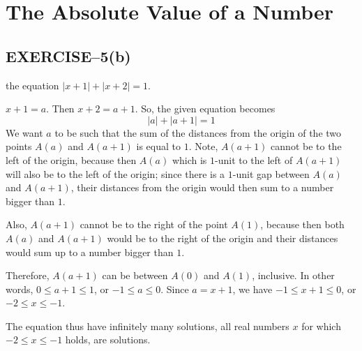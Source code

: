 \documentclass{tufte-book} %
\begin{document}
\section{The Absolute Value of a Number}

\subsection*{EXERCISE--5(b)}

 the equation $|x+1| + |x+2| = 1$.

 $x+1 = a$. Then $x+2 = a+1$. So, the given equation becomes
\[
	|a| + |a+1| = 1
\]
We want $a$ to be such that the sum of the distances from the origin of the two points $A(a)$ and $A(a+1)$ is equal to $1$. Note, $A(a+1)$ cannot be to the left of the origin, because then $A(a)$ which is $1$-unit to the left of $A(a+1)$ will also be to the left of the origin; since there is a $1$-unit gap between $A(a)$ and $A(a+1)$, their distances from the origin would then sum to a number bigger than $1$.

Also, $A(a+1)$ cannot be to the right of the point $A(1)$, because then both $A(a)$ and $A(a+1)$ would be to the right of the origin and their distances would sum up to a number bigger than $1$.

Therefore, $A(a+1)$ can be between $A(0)$ and $A(1)$, inclusive. In other words, $0 \leq a+1 \leq 1$, or $-1 \leq a \leq 0$. Since $a = x+1$, we have $-1 \leq x+1 \leq 0$, or $-2 \leq x \leq -1$.

The equation thus have infinitely many solutions, all real numbers $x$ for which $-2 \leq x \leq -1$ holds, are solutions.
\end{document}
